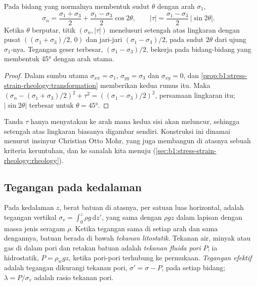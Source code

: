 \begin{proposition}\label{prop:b1:stress-strain-rheology:mohr}
Pada bidang yang normalnya membentuk sudut $\theta$ dengan arah $\sigma_1$,
\[
  \sigma_n = \frac{\sigma_1+\sigma_3}{2} + \frac{\sigma_1-\sigma_3}{2}\cos2\theta,
  \qquad
  |\tau| = \frac{\sigma_1-\sigma_3}{2}\,|\sin2\theta| .
\]
Ketika $\theta$ berputar, titik $(\sigma_n, |\tau|)$ menelusuri setengah atas lingkaran dengan pusat $((\sigma_1+\sigma_3)/2,\, 0)$ dan jari-jari $(\sigma_1-\sigma_3)/2$, pada sudut $2\theta$ dari ujung $\sigma_1$-nya. Tegangan geser terbesar, $(\sigma_1-\sigma_3)/2$, bekerja pada bidang-bidang yang membentuk \ang{45} dengan arah utama.
\end{proposition}

\begin{proof}
Dalam sumbu utama $\sigma_{xx} = \sigma_1$, $\sigma_{yy} = \sigma_3$ dan
$\sigma_{xy} = 0$, dan \cref{prop:b1:stress-strain-rheology:transformation}
memberikan kedua rumus itu. Maka
$(\sigma_n - (\sigma_1+\sigma_3)/2)^2 + \tau^2 = ((\sigma_1-\sigma_3)/2)^2$, persamaan
lingkaran itu; $|\sin2\theta|$ terbesar untuk $\theta = \ang{45}$.
\end{proof}

Tanda $\tau$ hanya menyatakan ke arah mana kedua sisi akan meluncur, sehingga setengah atas lingkaran biasanya digambar sendiri. Konstruksi ini dinamai menurut insinyur Christian Otto Mohr, yang juga membangun di atasnya sebuah kriteria keruntuhan, dan ke sanalah kita menuju (\cref{sec:b1:stress-strain-rheology:rheology}).

\subsection*{Tegangan pada kedalaman}

\begin{definition}\label{def:b1:stress-strain-rheology:lithostatic}
Pada kedalaman $z$, berat batuan di atasnya, per satuan luas horizontal, adalah tegangan vertikal $\sigma_v = \int_0^z\rho g\,\mathrm dz'$, yang sama dengan $\rho g z$ dalam lapisan dengan massa jenis seragam $\rho$. Ketika tegangan sama di setiap arah dan sama dengannya, batuan berada di bawah \emph{tekanan
litostatik}. Tekanan air, minyak atau gas di dalam pori dan retakan batuan adalah \emph{tekanan fluida
pori} $P$; ia hidrostatik, $P = \rho_w g z$, ketika pori-pori terhubung ke permukaan. \emph{Tegangan efektif} adalah tegangan dikurangi tekanan pori, $\sigma' = \sigma - P$, pada setiap bidang; $\lambda = P/\sigma_v$ adalah rasio tekanan pori.
\end{definition}

